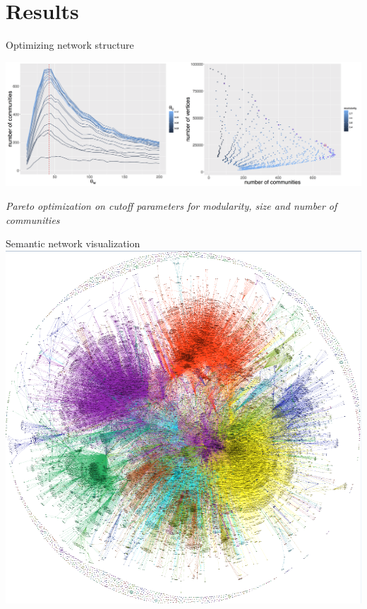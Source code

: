 \documentclass{beamer}
\begin{document}
\section{Results}
\begin{frame}{Optimizing network structure}
    
    \centering
    \includegraphics[width=\textwidth]{figures/Fig1.png}
    
    \medskip
    
    \textit{Pareto optimization on cutoff parameters for modularity, size and number of communities}
    
\end{frame}

\begin{frame}{Semantic network visualization}
   \centering
    \includegraphics[height=\textheight]{figures/Fig2.png}
    
\end{frame}
\end{document}
